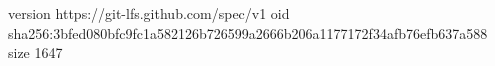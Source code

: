 version https://git-lfs.github.com/spec/v1
oid sha256:3bfed080bfc9fc1a582126b726599a2666b206a1177172f34afb76efb637a588
size 1647
